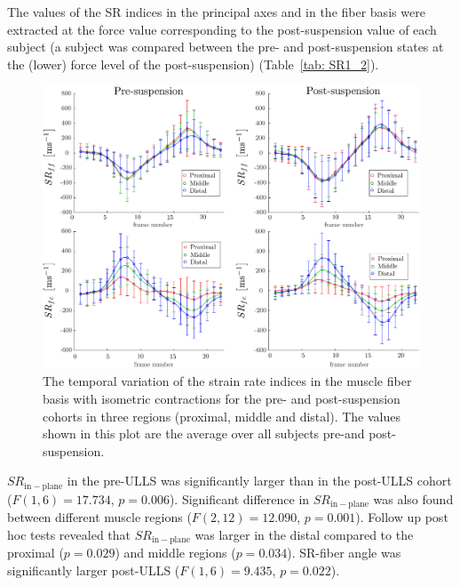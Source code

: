 The values of the SR indices in the principal axes and in the fiber basis were extracted at the force value corresponding to the post-suspension value of each subject (a subject was compared between the pre- and post-suspension states at the (lower) force level of the post-suspension) (Table~\ref{tab: SR1_2}).
\begin{figure}[!htb]
\vspace{+0.2cm}
\centering
\includegraphics[width=\textwidth]{Figures/ULLS_SRff.pdf}
\caption[The temporal variation of the strain rate indices in the muscle fiber basis with isometric contractions for the pre- and post-suspension cohorts in three regions]{The temporal variation of the strain rate indices in the muscle fiber basis with isometric contractions for the pre- and post-suspension cohorts in three regions (proximal, middle and distal). The values shown in this plot are the average over all subjects pre-and post-suspension.}
\label{fig: SR1_4}
\end{figure}
$SR_{\mathrm{in-plane}}$ in the pre-ULLS was significantly larger than in the post-ULLS cohort ($F(1, 6) = 17.734$, $p = 0.006$).
Significant difference in $SR_{\mathrm{in-plane}}$ was also found between different muscle regions ($F(2,12)=12.090$, $p = 0.001$). 
Follow up post hoc tests revealed that $SR_{\mathrm{in-plane}}$ was larger in the distal compared to the proximal ($p = 0.029$) and middle regions ($p = 0.034$). 
SR-fiber angle was significantly larger post-ULLS ($F(1,6) = 9.435$, $p = 0.022$).
